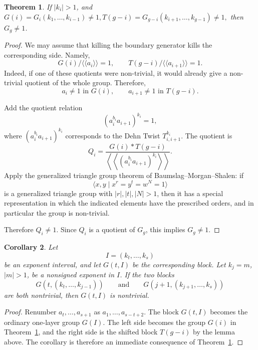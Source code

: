 \documentclass{article}
\newtheorem{theorem}{Theorem}[section]
\newtheorem{cy}[theorem]{Corollary}
\begin{document}
\begin{theorem}
\label{thm:ordinary-one-layer-reduction}
  If $|k_i|>1$, and $G(i)=G_i(k_1,\ldots ,k_{i-1})\neq 1, T(g-i)=G_{g-i}(k_{i+1},\ldots ,k_{g-1})\neq 1,$ then %
$G_g\neq 1$.


\end{theorem}

\begin{proof}
We may  assume that killing the
boundary generator kills the corresponding side.  Namely,
\[
G(i)/\langle\!\langle a_i\rangle\!\rangle=1,
\qquad
T(g-i)/\langle\!\langle a_{i+1}\rangle\!\rangle=1.
\]
Indeed, if one of these quotients were non-trivial, it would already give a
non-trivial quotient of the whole group.  Therefore,  \[
a_i\ne 1\text{ in }G(i),
\qquad
a_{i+1}\ne 1\text{ in }T(g-i).
\]



Add the quotient relation
\[
(a_i^{b_i} a_{i+1})^{k_i}=1,
\]
where $(a_i^{b_i} a_{i+1})^{k_i}$ corresponds to the Dehn Twist $T_{i,i+1}^{k_i}$. The quotient is 
\[
Q_i=
\frac{
G(i)*T(g-i)
}{
\left\langle\!\left\langle (a_i ^{b_i}a_{i+1})^{k_i}
\right\rangle\!\right\rangle
}.
\]
Apply the generalized triangle group theorem of Baumslag--Morgan--Shalen:
 if
\[
\langle x,y\mid x^r=y^t=w^N=1\rangle
\]
is a generalized triangle group with \(|r|,|t|,|N|>1\), then it has a
special representation in which the indicated elements have the prescribed
orders, and in particular the group is non-trivial. 

Therefore
\(
Q_i\neq1.
\)
Since \(Q_i\) is a quotient of \(G_g\), this  implies  \(G_g\neq1\).\end{proof}

\medskip
\noindent


\begin{cy}
\label{cor:ordinary-one-layer-block-reduction}
Let
\[
 I=(k_t,\ldots,k_s)
\]
be an exponent interval, and let $G(t,I)$ be the corresponding block.  Let
$k_j=m$, $|m|>1$, be a nonsigned exponent in $I$.  If the two blocks
\[
 G(t,(k_t,\ldots,k_{j-1}))
 \qquad\text{and}\qquad
 G(j+1,(k_{j+1},\ldots,k_s))
\]
are both nontrivial, then $G(t,I)$ is nontrivial.
\end{cy}

\begin{proof}
Renumber $a_t,\ldots,a_{s+1}$ as
$a_1,\ldots,a_{s-t+2}$.  The block $G(t,I)$ becomes the ordinary one-layer
group $G(I)$.  The left side becomes the group $G(i)$ in
Theorem~\ref{thm:ordinary-one-layer-reduction}, and the right side is the
shifted block $T(g-i)$ by the lemma above.  The corollary is therefore an
immediate consequence of Theorem~\ref{thm:ordinary-one-layer-reduction}.
\end{proof}
\end{document}
